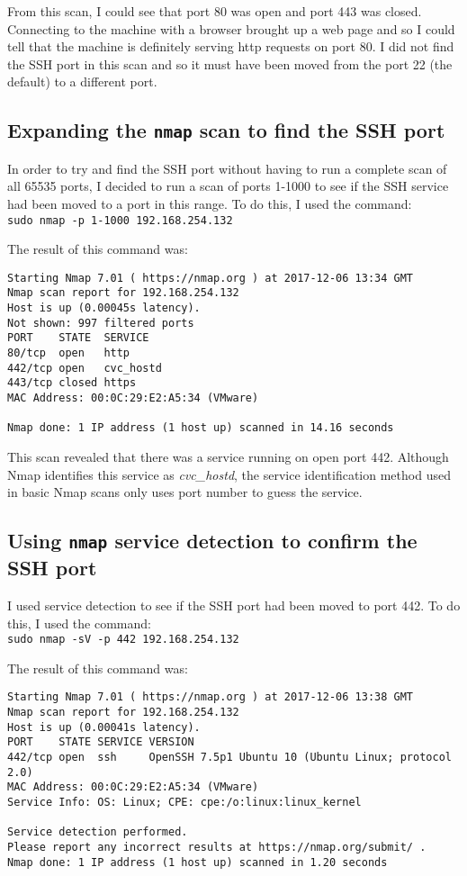 \documentclass[12pt]{report}
\newcommand{\term}[1]{\colorbox{light-gray}{\texttt{#1}}}
\begin{document}
From this scan, I could see that port 80 was open and port 443 was closed. Connecting to the machine with a browser brought up a web page and so I could tell that the machine is definitely serving http requests on port 80. I did not find the SSH port in this scan and so it must have been moved from the port 22 (the default) to a different port.

\subsection{Expanding the \texttt{nmap} scan to find the SSH port}
In order to try and find the SSH port without having to run a complete scan of all 65535 ports, I decided to run a scan of ports 1-1000 to see if the SSH service had been moved to a port in this range. To do this, I used the command:\\
\term{sudo nmap -p 1-1000 192.168.254.132}

The result of this command was:
\begin{Verbatim}[frame=leftline]
Starting Nmap 7.01 ( https://nmap.org ) at 2017-12-06 13:34 GMT
Nmap scan report for 192.168.254.132
Host is up (0.00045s latency).
Not shown: 997 filtered ports
PORT    STATE  SERVICE
80/tcp  open   http
442/tcp open   cvc_hostd
443/tcp closed https
MAC Address: 00:0C:29:E2:A5:34 (VMware)

Nmap done: 1 IP address (1 host up) scanned in 14.16 seconds
\end{Verbatim}

This scan revealed that there was a service running on open port 442. Although Nmap identifies this service as \textit{cvc\_hostd}, the service identification method used in basic Nmap scans only uses port number to guess the service.

\subsection{Using \texttt{nmap} service detection to confirm the SSH port}
I used service detection to see if the SSH port had been moved to port 442. To do this, I used the command:\\
\term{sudo nmap -sV -p 442 192.168.254.132}

The result of this command was:
\begin{Verbatim}[frame=leftline]
Starting Nmap 7.01 ( https://nmap.org ) at 2017-12-06 13:38 GMT
Nmap scan report for 192.168.254.132
Host is up (0.00041s latency).
PORT    STATE SERVICE VERSION
442/tcp open  ssh     OpenSSH 7.5p1 Ubuntu 10 (Ubuntu Linux; protocol 2.0)
MAC Address: 00:0C:29:E2:A5:34 (VMware)
Service Info: OS: Linux; CPE: cpe:/o:linux:linux_kernel

Service detection performed.
Please report any incorrect results at https://nmap.org/submit/ .
Nmap done: 1 IP address (1 host up) scanned in 1.20 seconds
\end{Verbatim}
\end{document}

